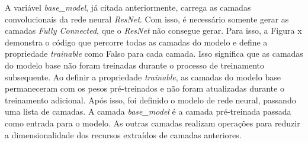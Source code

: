 A variável \textit{base\_model}, já citada anteriormente, carrega as camadas convolucionais da rede neural \textit{ResNet}. Com isso, é necessário somente gerar as camadas \textit{Fully Connected}, que o \textit{ResNet} não consegue gerar. Para isso, a Figura x demonstra o código que percorre todas as camadas do modelo e define a propriedade \textit{trainable} como Falso para cada camada. Isso significa que as camadas do modelo base não foram treinadas durante o processo de treinamento subsequente. Ao definir a propriedade \textit{trainable}, as camadas do modelo base permaneceram com os pesos pré-treinados e não foram atualizadas durante o treinamento adicional. Após isso, foi definido o modelo de rede neural, passando uma lista de camadas. A camada \textit{base\_model} é a camada pré-treinada passada como entrada para o modelo. As outras camadas realizam operações para reduzir a dimensionalidade dos recursos extraídos de camadas anteriores.


